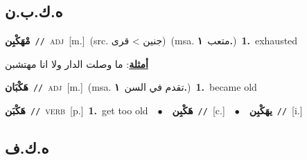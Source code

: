 \documentclass[10pt,a4paper,twoside]{article} %
\begin{document}
\begin{multicols}{2}
\vspace{-3mm}
\subsection*{\color{blue}\foreignlanguage{arabic}{ه.ك.ب.ن}\color{blue}{}} 

{\setlength\topsep{0pt}\textbf{\foreignlanguage{arabic}{مْهَكْبِن}}\ {\color{gray}\texttt{//}\color{black}}\ \textsc{adj}\ [m.]\ (src. \color{gray}\foreignlanguage{arabic}{جنين > قرى}\color{black})\ \color{gray}(msa. \foreignlanguage{arabic}{متعب}~\foreignlanguage{arabic}{\textbf{١.}})\color{black}\ \textbf{1.}~exhausted\  \begin{flushright}\color{gray}\foreignlanguage{arabic}{\textbf{\underline{\foreignlanguage{arabic}{أمثلة}}}: ما وصلت الدار ولا انا مهتشبن}\end{flushright}\color{black}} \vspace{2mm}

{\setlength\topsep{0pt}\textbf{\foreignlanguage{arabic}{هَكْبَان}}\ {\color{gray}\texttt{//}\color{black}}\ \textsc{adj}\ [m.]\ \color{gray}(msa. \foreignlanguage{arabic}{تقدم في السن}~\foreignlanguage{arabic}{\textbf{١.}})\color{black}\ \textbf{1.}~became old\ } \vspace{2mm}

{\setlength\topsep{0pt}\textbf{\foreignlanguage{arabic}{هَكْبَن}}\ {\color{gray}\texttt{//}\color{black}}\ \textsc{verb}\ [p.]\ \textbf{1.}~get too old\ \ $\bullet$\ \ \setlength\topsep{0pt}\textbf{\foreignlanguage{arabic}{هَكْبِن}}\ {\color{gray}\texttt{//}\color{black}}\ [c.]\ \ $\bullet$\ \ \setlength\topsep{0pt}\textbf{\foreignlanguage{arabic}{يهَكْبِن}}\ {\color{gray}\texttt{//}\color{black}}\ [i.]\ } \vspace{2mm}

\vspace{-3mm}
\subsection*{\color{blue}\foreignlanguage{arabic}{ه.ك.ف}\color{blue}{}} 


\end{multicols}
\end{document}
